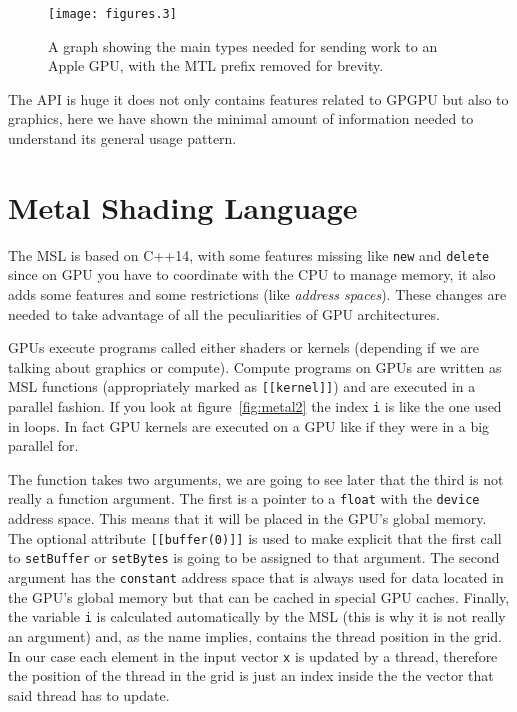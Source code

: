 \documentclass{sapthesis}
\begin{document}
\begin{figure}
\centering
\texttt{[image: figures.3]}
\caption{A graph showing the main types needed for sending work to an Apple GPU,
with the \textsf{MTL} prefix removed for brevity.}
\label{fig:metal.framework}
\end{figure}

The API is huge it does not only contains features related to GPGPU but also to
graphics, here we have shown the minimal amount of information needed to
understand its general usage pattern.

\section{Metal Shading Language}

The MSL is based on C++14, with some features missing like \texttt{new} and
\texttt{delete} since on GPU you have to coordinate with the CPU to manage
memory, it also adds some features and some restrictions (like \emph{address
spaces}). These changes are needed to take advantage of all the peculiarities of
GPU architectures.

GPUs execute programs called either shaders or kernels (depending if we are
talking about graphics or compute). Compute programs on GPUs are written as MSL
functions (appropriately marked as \texttt{[[kernel]]}) and are executed in a
parallel fashion. If you look at figure~\ref{fig:metal2} the index \texttt{i} is
like the one used in loops. In fact GPU kernels are executed on a GPU like if
they were in a big parallel for.

The function takes two arguments, we are going to see later that the third is
not really a function argument. The first is a pointer to a \texttt{float} with
the \texttt{device} address space. This means that it will be placed in the
GPU's global memory. The optional attribute \texttt{[[buffer(0)]]} is used to
make explicit that the first call to \texttt{setBuffer} or \texttt{setBytes} is
going to be assigned to that argument. The second argument has the
\texttt{constant} address space that is always used for data located in the
GPU's global memory but that can be cached in special GPU caches. Finally, the
variable \texttt i is calculated automatically by the MSL (this is why it is not
really an argument) and, as the name implies, contains the thread position in
the grid. In our case each element in the input vector \texttt x is updated by a
thread, therefore the position of the thread in the grid is just an index inside
the the vector that said thread has to update.
\end{document}
